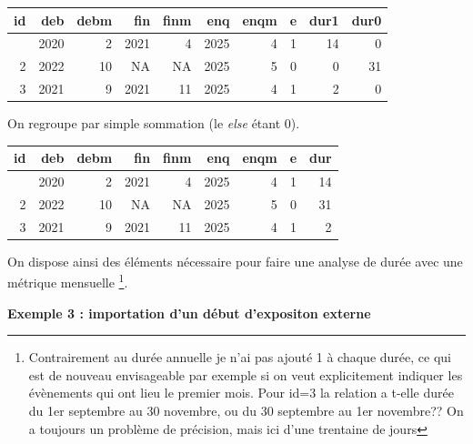 \documentclass[
  12pt,
  letterpaper,
  DIV=11,
  numbers=noendperiod,
  onepage,
  openany]{scrreprt}
\newenvironment{Shaded}{\begin{snugshade}}{\end{snugshade}}
\newcommand{\FunctionTok}[1]{\textcolor[rgb]{0.94,0.94,0.56}{#1}}
\newcommand{\NormalTok}[1]{\textcolor[rgb]{0.80,0.80,0.80}{#1}}
\newcommand{\OtherTok}[1]{\textcolor[rgb]{0.94,0.94,0.56}{#1}}
\newcommand{\SpecialCharTok}[1]{\textcolor[rgb]{0.86,0.64,0.64}{#1}}
\begin{document}
\begin{longtable}[]{@{}rrrrrrrrrr@{}}
\toprule\noalign{}
id & deb & debm & fin & finm & enq & enqm & e & dur1 & dur0 \\
\midrule\noalign{}
\endhead
\bottomrule\noalign{}
\endlastfoot
1 & 2020 & 2 & 2021 & 4 & 2025 & 4 & 1 & 14 & 0 \\
2 & 2022 & 10 & NA & NA & 2025 & 5 & 0 & 0 & 31 \\
3 & 2021 & 9 & 2021 & 11 & 2025 & 4 & 1 & 2 & 0 \\
\end{longtable}

On regroupe par simple sommation (le \emph{else} étant 0).

\begin{Shaded}
\end{Shaded}

\begin{longtable}[]{@{}rrrrrrrrr@{}}
\toprule\noalign{}
id & deb & debm & fin & finm & enq & enqm & e & dur \\
\midrule\noalign{}
\endhead
\bottomrule\noalign{}
\endlastfoot
1 & 2020 & 2 & 2021 & 4 & 2025 & 4 & 1 & 14 \\
2 & 2022 & 10 & NA & NA & 2025 & 5 & 0 & 31 \\
3 & 2021 & 9 & 2021 & 11 & 2025 & 4 & 1 & 2 \\
\end{longtable}

On dispose ainsi des éléments nécessaire pour faire une analyse de durée
avec une métrique mensuelle \footnote{Contrairement au durée annuelle je
  n'ai pas ajouté 1 à chaque durée, ce qui est de nouveau envisageable
  par exemple si on veut explicitement indiquer les évènements qui ont
  lieu le premier mois. Pour id=3 la relation a t-elle durée du 1er
  septembre au 30 novembre, ou du 30 septembre au 1er novembre?? On a
  toujours un problème de précision, mais ici d'une trentaine de jours}.

\textbf{Exemple 3 : importation d'un début d'expositon externe}
\end{document}
